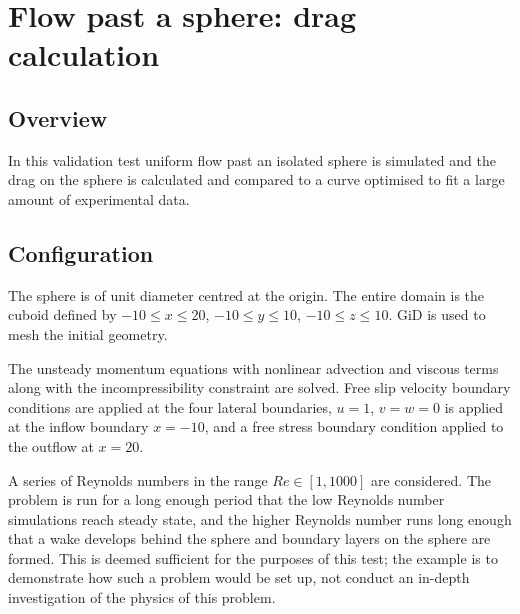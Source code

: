
\section{Flow past a sphere: drag calculation}
\label{sect:flow_past_sphere}
\subsection{Overview}
In this validation test uniform flow past an isolated sphere is simulated
and the drag on the sphere is calculated and compared to a curve optimised
to fit a large amount of experimental data.

\subsection{Configuration}
The sphere is of unit diameter centred at the origin. The entire domain is
the cuboid defined by $-10\le x\le 20$, $-10\le y\le 10$, $-10\le z\le 10$.
GiD is used to mesh the initial geometry.

The unsteady momentum equations with nonlinear advection and viscous terms
along with the incompressibility constraint are solved. Free slip velocity
boundary conditions are applied at the four lateral boundaries, $u=1$, $v=w=0$ is
applied at the inflow boundary $x=-10$, and a free stress boundary condition
applied to the outflow at $x=20$. 

A series of Reynolds numbers in the range
$Re\in [1,1000]$ are considered. The problem is run for a long enough
period that the low Reynolds number simulations reach steady state, and the
higher Reynolds number runs long enough that a wake develops behind the
sphere and boundary layers on the sphere are formed.  This is deemed
sufficient for the purposes of this test; the example is to demonstrate
how such a problem would be set up, not conduct an in-depth 
investigation of the physics of this problem.

